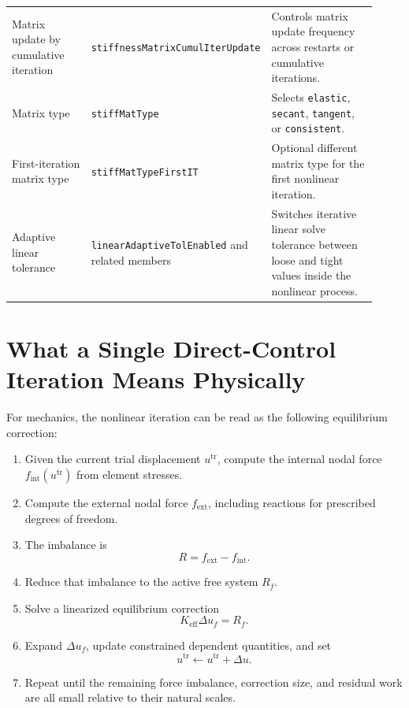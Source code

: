 \documentclass[11pt,a4paper]{article}
\newcommand{\code}[1]{\ifmmode\text{\texttt{\detokenize{#1}}}\else\nolinkurl{#1}\fi}
\begin{document}
\begin{longtable}{p{0.24\linewidth} p{0.34\linewidth} p{0.34\linewidth}}
Matrix update by cumulative iteration & \code{stiffnessMatrixCumulIterUpdate} &
Controls matrix update frequency across restarts or cumulative iterations. \\

Matrix type & \code{stiffMatType} &
Selects \code{elastic}, \code{secant}, \code{tangent}, or \code{consistent}. \\

First-iteration matrix type & \code{stiffMatTypeFirstIT} &
Optional different matrix type for the first nonlinear iteration. \\

Adaptive linear tolerance & \code{linearAdaptiveTolEnabled} and related members &
Switches iterative linear solve tolerance between loose and tight values inside
the nonlinear process. \\
\bottomrule
\end{longtable}

\section{What a Single Direct-Control Iteration Means Physically}

For mechanics, the nonlinear iteration can be read as the following equilibrium
correction:

\begin{enumerate}[leftmargin=2em]
  \item Given the current trial displacement \(u^{\mathrm{tr}}\), compute the
        internal nodal force \(f_{\mathrm{int}}(u^{\mathrm{tr}})\) from element
        stresses.
  \item Compute the external nodal force \(f_{\mathrm{ext}}\), including
        reactions for prescribed degrees of freedom.
  \item The imbalance is
        \[
          R = f_{\mathrm{ext}} - f_{\mathrm{int}}.
        \]
  \item Reduce that imbalance to the active free system \(R_f\).
  \item Solve a linearized equilibrium correction
        \[
          K_{\mathrm{eff}} \Delta u_f = R_f.
        \]
  \item Expand \(\Delta u_f\), update constrained dependent quantities, and set
        \[
          u^{\mathrm{tr}} \leftarrow u^{\mathrm{tr}} + \Delta u.
        \]
  \item Repeat until the remaining force imbalance, correction size, and
        residual work are all small relative to their natural scales.
\end{enumerate}
\end{document}
